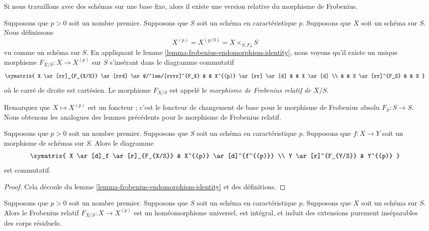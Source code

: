 \noindent
Si nous travaillons avec des schémas sur une base fixe,
alors il existe une version relative du morphisme de Frobenius.

\begin{definition}
\label{definition-relative-frobenius}
Supposons que $p > 0$ soit un nombre premier. Supposons que $S$ soit un schéma en
caractéristique $p$. Supposons que $X$ soit un schéma sur $S$. Nous définissons
$$
X^{(p)} = X^{(p/S)} = X \times_{S, F_S} S
$$
vu comme un schéma sur $S$. En appliquant le lemme
\ref{lemma-frobenius-endomorphism-identity}, nous voyons
qu'il existe un unique morphisme $F_{X/S} : X
\longrightarrow X^{(p)}$ sur $S$ s'insérant dans le diagramme commutatif
$$
\xymatrix{
X \ar[rr]_{F_{X/S}} \ar[rrd] \ar@/^1em/[rrrr]^{F_X}
& & X^{(p)} \ar[rr] \ar[d] & & X \ar[d] \\
& & S \ar[rr]^{F_S} & & S
}
$$
où le carré de droite est cartésien. Le morphisme $F_{X/S}$
est appelé le {\it morphisme de Frobenius relatif de $X/S$}.
\end{definition}

\noindent
Remarquez que $X \mapsto X^{(p)}$ est un foncteur ; c'est le foncteur de
changement de base pour le morphisme de Frobenius absolu $F_S : S \to S$. Nous
obtenons les analogues des lemmes précédents pour le morphisme de Frobenius relatif.

\begin{lemma}
\label{lemma-relative-frobenius-endomorphism-identity}
Supposons que $p > 0$ soit un nombre premier. Supposons que
$S$ soit un schéma en caractéristique $p$. Supposons que $f : X
\to Y$ soit un morphisme de schémas sur $S$. Alors le diagramme
$$
\xymatrix{
X \ar[d]_f \ar[r]_{F_{X/S}} & X^{(p)} \ar[d]^{f^{(p)}} \\
Y \ar[r]^{F_{Y/S}} & Y^{(p)}
}
$$
est commutatif.
\end{lemma}

\begin{proof}
Cela découle du lemme
\ref{lemma-frobenius-endomorphism-identity} et des définitions.
\end{proof}

\begin{lemma}
\label{lemma-relative-frobenius}
Supposons que $p > 0$ soit un nombre premier. Supposons que
$S$ soit un schéma en caractéristique $p$. Supposons que $X$
soit un schéma sur $S$. Alors le Frobenius relatif $F_{X/S} : X
\to X^{(p)}$ est un homéomorphisme universel, est intégral, et
induit des extensions purement inséparables des corps résiduels.
\end{lemma}

